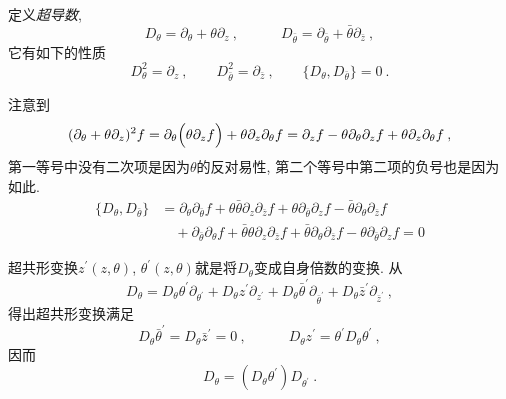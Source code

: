 定义{\emph{超导数}},
\begin{equation}
    D_{\theta} = \partial_{\theta} + \theta \partial_{z}\:, \qquad \quad 
    D_{\bar{\theta}} = \partial_{\bar{\theta}}+ \bar{\theta}\partial_{\bar{z}} \:, \label{12.3.3}
\end{equation}
它有如下的性质
\begin{equation}
    D_{\theta}^{2} = \partial_{z}\:, \qquad D_{\bar{\theta}}^{2} = \partial_{\bar{z}}\:,\qquad
    \{D_{\theta},D_{\bar{\theta}}\} = 0 \:. \label{12.3.4}
\end{equation}
\begin{tcolorbox}
注意到
\begin{align*}
    (\partial_{\theta}+\theta\partial_{z})^{2}f =\partial_{\theta}\Bigl(\theta \partial_{z}f\Bigr)
    +\theta \partial_{z}\partial_{\theta} f = \partial_{z}f - \theta \partial_{\theta}\partial_{z}f
    +\theta \partial_{z}\partial_{\theta} f \:,
\end{align*}
第一等号中没有二次项是因为$ \theta $的反对易性, 第二个等号中第二项的负号也是因为如此.
\begin{align*}
    \{D_{\theta},D_{\bar{\theta}}\} &=\partial_{\theta}\partial_{\bar{\theta}}f+ \theta\bar{\theta}\partial_{z}\partial_{\bar{z}}f+\theta\partial_{\bar{\theta}}\partial_{z}f
    -\bar{\theta}\partial_{\theta}\partial_{\bar{z}}f \\
    &\quad +\partial_{\bar{\theta}}\partial_{\theta}f+ \bar{\theta}\theta\partial_{z}\partial_{\bar{z}}f
    +\bar{\theta}\partial_{\theta}\partial_{\bar{z}}f -\theta\partial_{\bar{\theta}}\partial_{z}f =0
\end{align*}
\end{tcolorbox}
\noindent 超共形变换$ z^{\prime}(z,\theta)$, $\theta^{\prime}(z,\theta) $就是将$ D_{\theta} $变成自身倍数的变换. 从
\begin{equation}
    D_{\theta} = D_{\theta} \theta^{\prime} \partial_{\theta^{\prime}}
    +D_{\theta}z^{\prime}\partial_{z^{\prime}} + D_{\theta}\bar{\theta}^{\prime}\partial_{\bar{\theta}^{\prime}}
    +D_{\theta}\bar{z}^{\prime}\partial_{\bar{z}^{\prime}} \:, \label{12.3.5}
\end{equation}
得出超共形变换满足
\begin{equation}
     D_{\theta}\bar{\theta}^{\prime}=D_{\theta}\bar{z}^{\prime}=0\:, \qquad \quad
     D_{\theta}z^{\prime} = \theta^{\prime}D_{\theta}\theta^{\prime} \:, \label{12.3.6}
\end{equation}
因而
\begin{equation}
    D_{\theta}= (D_{\theta}\theta^{\prime})D_{\theta^{\prime}} \:. \label{12.3.7}
\end{equation}
